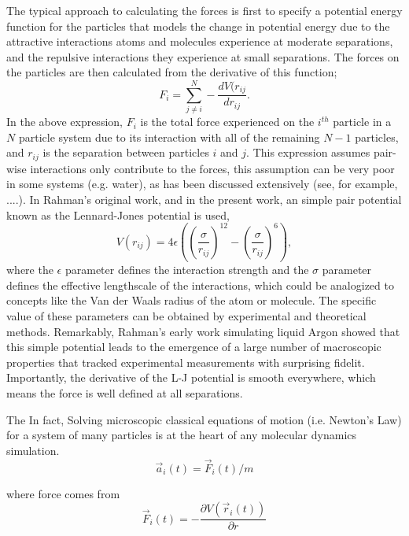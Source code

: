 \documentclass[journal=jpclcd,manuscript=article]{achemso}
\begin{document}
The typical approach to calculating the forces is first to specify a potential energy function for the particles
that models the change in potential energy due to the attractive interactions atoms and molecules experience
at moderate separations, and the repulsive interactions they experience at small separations.  The forces on the particles
are then calculated from the derivative of this function;
\begin{equation}
F_i = \sum_{j \neq i}^N - \frac{d V( r_{ij} }{d r_{ij}}.
\end{equation}
In the above expression, $F_i$ is the total force experienced on the $i^{th}$ particle in a $N$ particle system
due to its interaction with all of the remaining $N-1$ particles, and $r_{ij}$ is the separation between
particles $i$ and $j$.  This expression assumes pair-wise interactions only contribute to the forces, this assumption
can be very poor in some systems (e.g. water), as has been discussed extensively (see, for example, ....).  
In Rahman's original work, and in the present work, an simple pair potential known as the Lennard-Jones potential 
is used,
\begin{equation}
V(r_{ij}) = 4 \epsilon \left( \left( \frac{\sigma}{r_{ij}} \right)^{12} - \left(\frac{\sigma}{r_{ij}} \right)^6 \right),
\end{equation}
where the $\epsilon$ parameter defines the interaction strength and the $\sigma$ parameter defines the effective
lengthscale of the interactions, which could be analogized to concepts like the Van der Waals radius of the atom or molecule.
The specific value of these parameters can be obtained by experimental and theoretical methods.  Remarkably, Rahman's early
work simulating liquid Argon showed that this simple potential leads to the emergence of a large number of macroscopic properties 
that tracked experimental measurements with surprising fidelit. %
Importantly, the derivative of the L-J potential is smooth everywhere, which means the force is well defined
at all separations.  

The 
In fact, 
Solving microscopic classical equations of motion (i.e. Newton's Law) 
for a system of many particles is at the heart of 
any molecular dynamics simulation.   
\begin{equation}
\vec{a}_i(t) = \vec{F}_i(t) / m
\end{equation}

where force comes from
\begin{equation}
\vec{F}_i(t) = -\frac{ \partial V( \vec{r}_i(t) ) }{ \partial r}
\end{equation}
\end{document}
